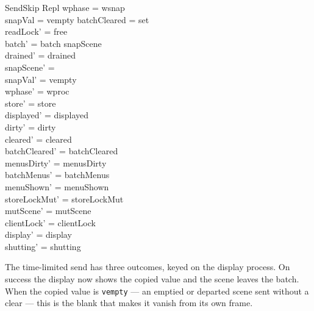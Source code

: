 \documentclass[a4paper,10pt,fleqn]{article}
\begin{document}
\begin{schema}{SendSkip}
  \Delta Repl
\where
  wphase = wsnap \\
  snapVal = vempty \land batchCleared = set \\
  readLock' = free \\
  batch' = batch \setminus snapScene \\
  drained' = drained \\
  snapScene' = \emptyset \\
  snapVal' = vempty \\
  wphase' = wproc \\
  store' = store \\
  displayed' = displayed \\
  dirty' = dirty \\
  cleared' = cleared \\
  batchCleared' = batchCleared \\
  menusDirty' = menusDirty \\
  batchMenus' = batchMenus \\
  menuShown' = menuShown \\
  storeLockMut' = storeLockMut \\
  mutScene' = mutScene \\
  clientLock' = clientLock \\
  display' = display \\
  shutting' = shutting
\end{schema}

The time-limited send has three outcomes, keyed on the display process.
On success the display now shows the copied value and the scene leaves the
batch.  When the copied value is \texttt{vempty} --- an emptied or departed
scene sent without a clear --- this is the blank that makes it vanish from
its own frame.
\end{document}
